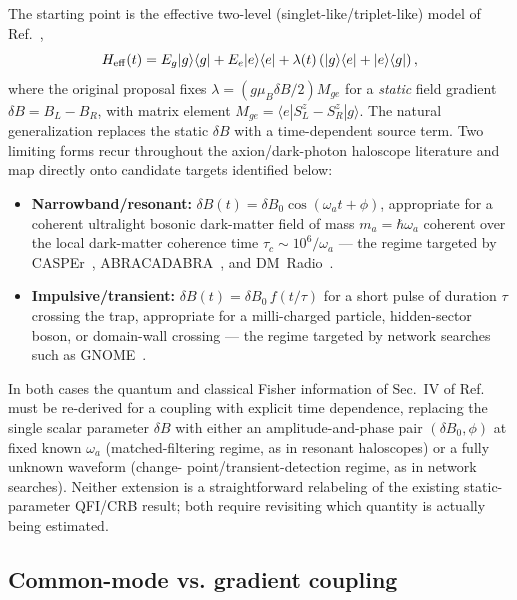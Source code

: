 \documentclass[aps,prxquantum,reprint,superscriptaddress,longbibliography]{revtex4-2}
\begin{document}
The starting point is the effective two-level (singlet-like/triplet-like) model of
Ref.~\cite{perruzza2026},
\begin{equation}
H_{\rm eff}(t) = E_g|g\rangle\langle g| + E_e|e\rangle\langle e| +
\lambda(t)\left(|g\rangle\langle e| + |e\rangle\langle g|\right),
\end{equation}
where the original proposal fixes $\lambda = (g\mu_B \delta B/2) M_{ge}$ for a \emph{static} field
gradient $\delta B = B_L - B_R$, with matrix element $M_{ge} = \langle e|S^z_L - S^z_R|g\rangle$. The
natural generalization replaces the static $\delta B$ with a time-dependent source term. Two limiting
forms recur throughout the axion/dark-photon haloscope literature and map directly onto candidate
targets identified below:
\begin{itemize}
  \item \textbf{Narrowband/resonant:} $\delta B(t) = \delta B_0\cos(\omega_a t + \phi)$, appropriate
  for a coherent ultralight bosonic dark-matter field of mass $m_a = \hbar\omega_a$ coherent over the
  local dark-matter coherence time $\tau_c \sim 10^6/\omega_a$ — the regime targeted by
  CASPEr~\cite{budker2014proposal}, ABRACADABRA~\cite{ouellet2019design,salemi2021search}, and
  DM~Radio~\cite{silvafeaver2017design}.
  \item \textbf{Impulsive/transient:} $\delta B(t) = \delta B_0\, f(t/\tau)$ for a short pulse of
  duration $\tau$ crossing the trap, appropriate for a milli-charged particle, hidden-sector boson, or
  domain-wall crossing — the regime targeted by network searches such as
  GNOME~\cite{afach2021search,afach2023gnome}.
\end{itemize}
In both cases the quantum and classical Fisher information of Sec.~IV of Ref.~\cite{perruzza2026}
must be re-derived for a coupling with explicit time dependence, replacing the single scalar
parameter $\delta B$ with either an amplitude-and-phase pair $(\delta B_0,\phi)$ at fixed known
$\omega_a$ (matched-filtering regime, as in resonant haloscopes) or a fully unknown waveform (change-
point/transient-detection regime, as in network searches). Neither extension is a straightforward
relabeling of the existing static-parameter QFI/CRB result; both require revisiting which quantity is
actually being estimated.

\subsection{Common-mode vs. gradient coupling}
\end{document}
